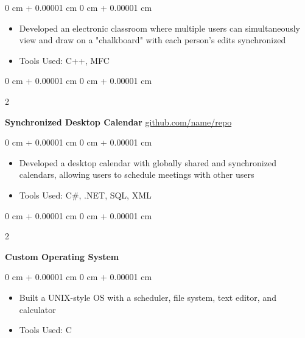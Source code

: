 \documentclass[10pt, letterpaper]{article}
\newenvironment{highlights}{
    \begin{itemize}[
        topsep=0.10 cm,
        parsep=0.10 cm,
        partopsep=0pt,
        itemsep=0pt,
        leftmargin=0 cm + 10pt
    ]
}{
    \end{itemize}
} %
\newenvironment{onecolentry}{
    \begin{adjustwidth}{
        0 cm + 0.00001 cm
    }{
        0 cm + 0.00001 cm
    }
}{
    \end{adjustwidth}
} %
\newenvironment{twocolentry}[2][]{
    \onecolentry
    \def\secondColumn{#2}
    \setcolumnwidth{\fill, 4.5 cm}
    \begin{paracol}{2}
}{
    \switchcolumn \raggedleft \secondColumn
    \end{paracol}
    \endonecolentry
} %
\begin{document}
        \vspace{0.10 cm}
        \begin{onecolentry}
            \begin{highlights}
                \item Developed an electronic classroom where multiple users can simultaneously view and draw on a "chalkboard" with each person's edits synchronized
                \item Tools Used: C++, MFC
            \end{highlights}
        \end{onecolentry}


        \vspace{0.2 cm}

        \begin{twocolentry}{
            \href{https://github.com/sinaatalay/rendercv}{github.com/name/repo}
        }
            \textbf{Synchronized Desktop Calendar}\end{twocolentry}

        \vspace{0.10 cm}
        \begin{onecolentry}
            \begin{highlights}
                \item Developed a desktop calendar with globally shared and synchronized calendars, allowing users to schedule meetings with other users
                \item Tools Used: C\#, .NET, SQL, XML
            \end{highlights}
        \end{onecolentry}


        \vspace{0.2 cm}

        \begin{twocolentry}{
            2002
        }
            \textbf{Custom Operating System}\end{twocolentry}

        \vspace{0.10 cm}
        \begin{onecolentry}
            \begin{highlights}
                \item Built a UNIX-style OS with a scheduler, file system, text editor, and calculator
                \item Tools Used: C
            \end{highlights}
        \end{onecolentry}
\end{document}
